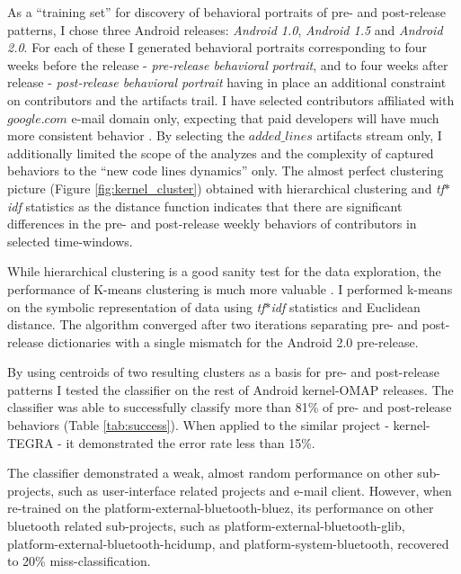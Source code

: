\documentclass[conference]{worldcomp}
\begin{document}
As a ``training set'' for discovery of behavioral portraits of pre- and post-release patterns, 
I chose three Android releases: \textit{Android 1.0}, \textit{Android 1.5} and \textit{Android 2.0}. 
For each of these I generated behavioral portraits corresponding to four weeks before the 
release - \textit{pre-release behavioral portrait}, 
and to four weeks after release - \textit{post-release behavioral portrait}
having in place an additional constraint on contributors and the artifacts trail. 
I have selected contributors affiliated with $google.com$ e-mail domain only, expecting
that paid developers will have much more consistent behavior \cite{citeulike:10392277}.
By selecting the $added\_lines$ artifacts stream only, I additionally limited the scope of the
analyzes and the complexity of captured behaviors to the ``new code lines dynamics'' only.
The almost perfect clustering picture (Figure \ref{fig:kernel_cluster}) 
obtained with hierarchical clustering and \textit{tf$\ast$idf} statistics as the distance function 
indicates that there are significant differences in the pre- and post-release weekly behaviors
 of contributors in selected time-windows.

While hierarchical clustering is a good sanity test for the data exploration, the performance of K-means 
clustering is much more valuable \cite{citeulike:3562}. I performed k-means on the symbolic 
representation of data using \textit{tf$\ast$idf} statistics and Euclidean distance. The algorithm converged after two
iterations separating pre- and post-release dictionaries with a single mismatch for the Android 2.0 pre-release.

By using centroids of two resulting clusters as a basis for pre- and post-release patterns I tested 
the classifier on the rest of Android kernel-OMAP releases. The classifier was able to successfully classify 
more than 81\% of pre- and post-release behaviors (Table \ref{tab:success}). 
When applied to the similar project - kernel-TEGRA - it demonstrated the error rate less than 15\%.

The classifier demonstrated a weak, almost random performance on other sub-projects, such as user-interface
related projects and e-mail client. However, when re-trained on the platform-external-bluetooth-bluez, 
its performance on other bluetooth related sub-projects, such as platform-external-bluetooth-glib,
platform-external-bluetooth-hcidump, and platform-system-bluetooth, recovered to 20\% miss-classification.
\end{document}
